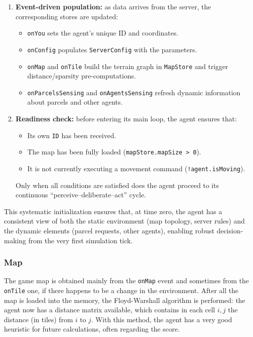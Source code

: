 \begin{enumerate}
  \item \textbf{Event-driven population:} as data arrives from the server, the corresponding stores are updated:
    \begin{itemize}
      \item \texttt{onYou} sets the agent’s unique ID and coordinates.  
      \item \texttt{onConfig} populates \texttt{ServerConfig} with the parameters.  
      \item \texttt{onMap} and \texttt{onTile} build the terrain graph in \texttt{MapStore} and trigger distance/sparsity pre-computations.  
      \item \texttt{onParcelsSensing} and \texttt{onAgentsSensing} refresh dynamic information about parcels and other agents.
    \end{itemize}

  \item \textbf{Readiness check:} before entering its main loop, the agent ensures that:
    \begin{itemize}
      \item Its own \texttt{ID} has been received.  
      \item The map has been fully loaded (\texttt{mapStore.mapSize > 0}).  
      \item It is not currently executing a movement command (\texttt{!agent.isMoving}).
    \end{itemize}
    Only when all conditions are satisfied does the agent proceed to its continuous “perceive–deliberate–act” cycle.
\end{enumerate}


This systematic initialization ensures that, at time zero, the agent has a consistent view of both the static environment (map topology, server rules) and the dynamic elements (parcel requests, other agents), enabling robust decision‐making from the very first simulation tick.

\subsubsection*{Map}
The game map is obtained mainly from the \texttt{onMap} event and sometimes from the \texttt{onTile} one, if there happens to be a change in the environment.
After all the map is loaded into the memory, the Floyd-Warshall algorithm is performed: the agent now has a distance matrix available, which contains in each cell $i, j$ the distance (in tiles) from $i$ to $j$.
With this method, the agent has a very good heuristic for future calculations, often regarding the score.


